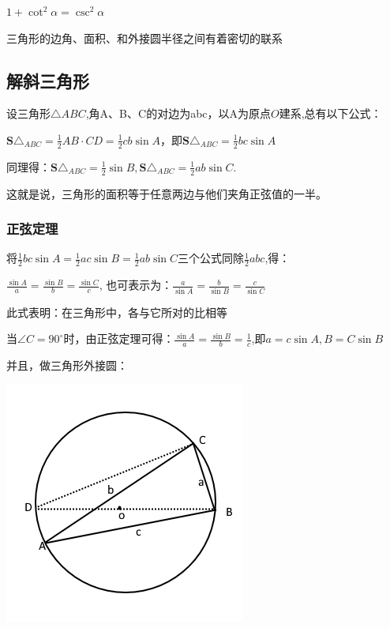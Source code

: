 \documentclass[UTF8]{ctexbook}
\newcommand{\degree}{^\circ}
\begin{document}
{{{  $1 + \cot^2\alpha = \csc^2\alpha$

}%

三角形的边角、面积、和外接圆半径之间有着密切的联系

\subsection{解斜三角形}{
设三角形$\triangle ABC$,角A、B、C的对边为abc，以A为原点$O$建系,总有以下公式：

$\mathbf{S}\triangle_{ABC} = \frac{1}{2}AB \cdot CD = \frac{1}{2}cb\sin A$，即$\mathbf{S}\triangle_{ABC} = \frac{1}{2}bc\sin A$

同理得：$\mathbf{S}\triangle_{ABC} = \frac{1}{2}\sin B, \mathbf{S}\triangle_{ABC} = \frac{1}{2}ab\sin C$.

这就是说，三角形的面积等于任意两边与他们夹角正弦值的一半。

\subsubsection{正弦定理}
将$\frac{1}{2}bc\sin A = \frac{1}{2}ac\sin B = \frac{1}{2}ab\sin C$三个公式同除$\frac{1}{2}abc$,得：

$\frac{\sin A}{a} = \frac{\sin B}{b} = \frac{\sin C}{c}$, 也可表示为：$\frac{a}{\sin A} = \frac{b}{\sin B} = \frac{c}{\sin C}$

此式表明：在三角形中，各{}与它所对{}的比相等

当$\angle C = 90\degree$时，由正弦定理可得：$\frac{\sin A}{a} = \frac{\sin B}{b} = \frac{1}{c}$,即$a = c\sin A,B = C\sin B$

并且，做三角形外接圆：

\includegraphics[scale=0.5]{resources/insideTriangleAndCircleOutSide.png}

}}}
\end{document}
